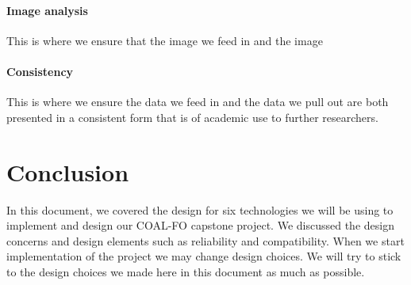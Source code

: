 \documentclass[10pt,draftclsnofoot,onecolumn,journal,compsoc]{IEEEtran}
\begin{document}
\paragraph{Image analysis}
This is where we ensure that the image we feed in and the image
\paragraph{Consistency}
This is where we ensure the data we feed in and the data we pull out are both presented in a consistent form that is of academic use to further researchers.

\section{Conclusion}

\noindent In this document, we covered the design for six technologies we will be using to implement and design our COAL-FO capstone project. We discussed the design concerns and design elements such as reliability and compatibility. When we start implementation of the project we may change design choices. We will try to stick to the design choices we made here in this document as much as possible.
\end{document}
